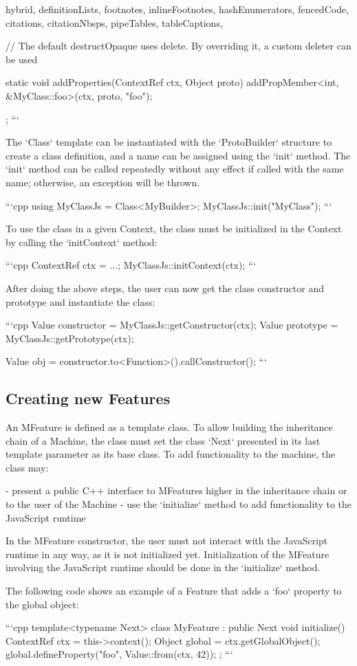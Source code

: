 \begin{markdown*}{%
  hybrid,
  definitionLists,
  footnotes,
  inlineFootnotes,
  hashEnumerators,
  fencedCode,
  citations,
  citationNbsps,
  pipeTables,
  tableCaptions,
}
{  // The default destructOpaque uses delete. By overriding it, a custom deleter can be used

  static void addProperties(ContextRef ctx, Object proto) {
    addPropMember<int, &MyClass::foo>(ctx, proto, "foo");
  }
};
```

The `Class` template can be instantiated with the `ProtoBuilder` structure to create a class definition, and a name can be assigned using the `init` method. The `init` method can be called repeatedly without any effect if called with the same name; otherwise, an exception will be thrown.

```cpp
using MyClassJs = Class<MyBuilder>;
MyClassJs::init("MyClass");
```

To use the class in a given Context, the class must be initialized in the Context by calling the `initContext` method:

```cpp
ContextRef ctx = ...;
MyClassJs::initContext(ctx);
```

After doing the above steps, the user can now get the class constructor and prototype and instantiate the class:

```cpp
Value constructor = MyClassJs::getConstructor(ctx);
Value prototype = MyClassJs::getPrototype(ctx);

Value obj = constructor.to<Function>().callConstructor();
```

\subsection{Creating new Features}

An MFeature is defined as a template class. To allow building the inheritance chain of a Machine, the class must set the class `Next` presented in its last template parameter as its base class. To add functionality to the machine, the class may:

  - present a public C++ interface to MFeatures higher in the inheritance chain or to the user of the Machine
  - use the `initialize` method to add functionality to the JavaScript runtime

In the MFeature constructor, the user must not interact with the JavaScript runtime in any way, as it is not initialized yet. Initialization of the MFeature involving the JavaScript runtime should be done in the `initialize` method.

The following code shows an example of a Feature that adds a `foo` property to the global object:

```cpp
template<typename Next>
class MyFeature : public Next {
    void initialize() {
        ContextRef ctx = this->context();
        Object global = ctx.getGlobalObject();
        global.defineProperty("foo", Value::from(ctx, 42));
    }
};
```


\end{markdown*}
